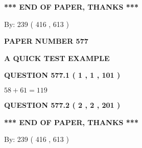 \documentclass[12pt]{article}
\begin{document}
   
 \vspace{0.2in}
 
   
   
   
   
\vspace{1.0in} 
{\textbf{\large{ *** END OF PAPER, THANKS *** }}} 
   
   
\hspace{1.0in} By: 
 239 ( 416 ,  613 )
   
   
   
   
\newpage 
\setcounter{page}{ 
   577001 } 
   
   
   
   
 {\textbf{ \Large{ PAPER NUMBER  577  }}}
   
   
\vspace{0.2in}
   
   
   
   
   
   
 \vspace{0.2in}
{\LARGE {\textbf{ A QUICK TEST EXAMPLE}}}
   
   
  
\vspace{0.2in}
  
{\textbf{\Large{QUESTION
577.1 
 ( 1 , 1 , 101 )
}}}
  
  
 
 

$ %
58 +  %
61=   %
119$
 
 
  
\vspace{0.2in}
  
{\textbf{\Large{QUESTION
577.2 
 ( 2 , 2 , 201 )
}}}
  
  
   
   
 \vspace{0.2in}
 
   
   
   
   
\vspace{1.0in} 
{\textbf{\large{ *** END OF PAPER, THANKS *** }}} 
   
   
\hspace{1.0in} By: 
 239 ( 416 ,  613 )
   
   
   
   
\newpage 
\setcounter{page}{ 
   578001 } 
   
   
   
\end{document}
